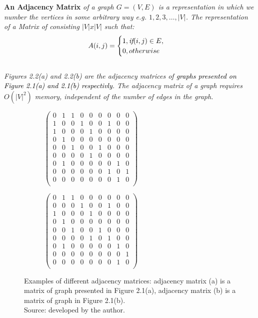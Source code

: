\begin{definition} \textbf{An Adjacency Matrix } \emph{of a graph $G=(V, E)$ is a representation in which we number the vertices in some arbitrary way e.g. $1,2,3,\dots, |V|$. The representation of a Matrix of
consisting $|V|x|V|$ such that: 
$$A(i,j)=
\begin{cases}
1, \emph{if}  (i,j)\in E,\\
0, otherwise\\
\end{cases}$$
}
\\
\emph{Figures 2.2(a) and 2.2(b) are the adjacency matrices of \textcolor{black}{graphs presented on Figure 2.1(a) and 2.1(b) respectivly}.
The adjacency matrix of a graph requires $O(|V|^2)$ memory, independent of the number of edges in the graph.}
\end{definition}
\begin{figure}[!h]
	\centering
	\begin{subfigure}{.35\textwidth}
	  \centering
	  $\begin{pmatrix}
		0&1&1&0&0&0&0&0&0\\
		1&0&0&1&0&0&1&0&0\\
		1&0&0&0&1&0&0&0&0\\
		0&1&0&0&0&0&0&0&0\\
		0&0&1&0&0&1&0&0&0\\
		0&0&0&0&1&0&0&0&0\\
		0&1&0&0&0&0&0&1&0\\
		0&0&0&0&0&0&1&0&1\\
		0&0&0&0&0&0&0&1&0\\
	\end{pmatrix}$
	  \caption{}
	  \label{fig:sub1}
	\end{subfigure}
	\begin{subfigure}{.35\textwidth}
	  \centering
	  $\begin{pmatrix}
		0&1&1&0&0&0&0&0&0\\
		0&0&0&1&0&0&1&0&0\\
		1&0&0&0&1&0&0&0&0\\
		0&1&0&0&0&0&0&0&0\\
		0&0&1&0&0&1&0&0&0\\
		0&0&0&0&1&0&1&0&0\\
		0&1&0&0&0&0&0&1&0\\
		0&0&0&0&0&0&0&0&1\\
		0&0&0&0&0&0&0&1&0\\
	\end{pmatrix}$
	  \caption{}
	  \label{fig:sub2}
	\end{subfigure}
	\caption{Examples of different adjacency matrices: adjacency matrix (a) is a matrix of graph presented in Figure 2.1(a), adjacency matrix (b) is a matrix of graph in Figure 2.1(b).\\Source: developed by the author.}
	\label{fig:test}
\end{figure}

